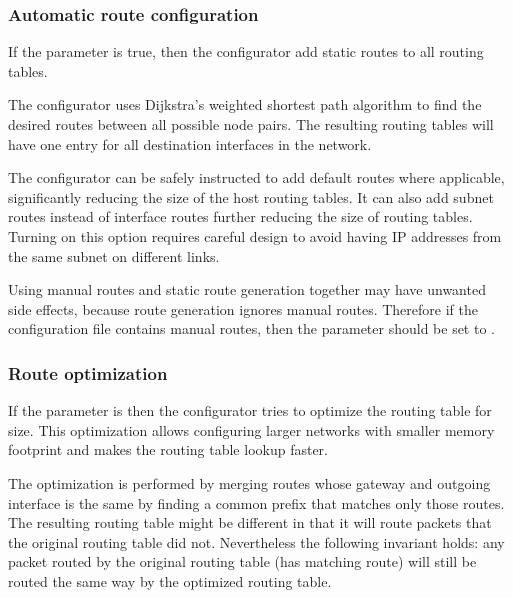 \subsubsection*{Automatic route configuration}

If the  parameter is true, then
the configurator add static routes to all routing tables.

The configurator uses Dijkstra's weighted shortest path algorithm to find
the desired routes between all possible node pairs. The resulting
routing tables will have one entry for all destination interfaces in the
network.


The configurator can be safely instructed to add default routes
where applicable, significantly reducing the size of the host routing
tables. It can also add subnet routes instead of interface routes further
reducing the size of routing tables. Turning on this option requires
careful design to avoid having IP addresses from the same subnet on
different links.


\begin{caution}
Using manual routes and static route generation
together may have unwanted side effects, because route generation ignores
manual routes. Therefore if the configuration file contains
manual routes, then the  parameter should be set
to .
\end{caution}

\subsubsection*{Route optimization}

If the  parameter is  then the
configurator tries to optimize the routing table for size.
This optimization allows configuring larger networks with smaller
memory footprint and makes the routing table lookup faster.

The optimization is performed by merging routes whose gateway and
outgoing interface is the same by finding a common prefix that
matches only those routes. The resulting routing table might be
different in that it will route packets that the original routing table
did not. Nevertheless the following invariant holds: any packet routed
by the original routing table (has matching route) will still be routed
the same way by the optimized routing table.

